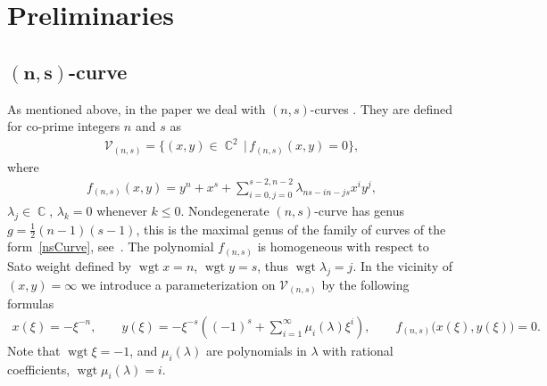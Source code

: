 \documentclass[pdftex]{sigma}
\numberwithin{equation}{section}
\DeclareMathOperator{\Complex}{\mathbb{C}}
\DeclareMathOperator{\wgt}{wgt}
\begin{document}
\section{Preliminaries}\label{s:Prel}

\subsection[$(n,s)$-curve]{$\boldsymbol{(n,s)}$-curve}\label{ss:nsCurve}
As mentioned above, in the paper we deal with $(n,s)$-curves \cite{BEL1999}.
They are defined for co-prime integers $n$ and $s$
as \begin{gather*}\mathcal{V}_{(n,s)}=\big\{(x,y)\in \Complex^2 \,|\, f_{(n,s)}(x,y) =0\big\},\end{gather*} where
\begin{gather}\label{nsCurve}
 f_{(n,s)}(x,y) = y^n + x^s + \sum_{i=0, j=0}^{s-2,n-2} \lambda_{ns-in- js} x^i y^j,
\end{gather}
$\lambda_{j}\in \Complex$, $\lambda_{k}=0$ whenever $k\leqslant 0$. Nondegenerate $(n,s)$-curve has genus $g = \frac{1}{2}(n - 1)(s - 1)$, {this is the maximal genus of the family of curves of the form~\eqref{nsCurve}}, see~\cite{BEL1999}. The polynomial $f_{(n,s)}$ is homogeneous with respect to Sato weight defined by $\wgt x = n$, $\wgt y=s$, thus $\wgt \lambda_j=j$. In the vicinity of $(x,y)=\infty$ we introduce a parameterization on $\mathcal{V}_{(n,s)}$ by the following formulas
\begin{gather*}%
x(\xi)=-\xi^{-n}, \qquad y(\xi)=-\xi^{-s}\left((-1)^s+ \sum_{i=1}^{\infty} \mu_i(\lambda) \xi^i\right), \qquad f_{(n,s)}\big(x(\xi),y(\xi)\big)=0.
\end{gather*}
Note that $\wgt \xi = -1$, and $\mu_i(\lambda)$ are polynomials in $\lambda$ with rational coefficients, $\wgt \mu_i(\lambda) = i$.
\end{document}
